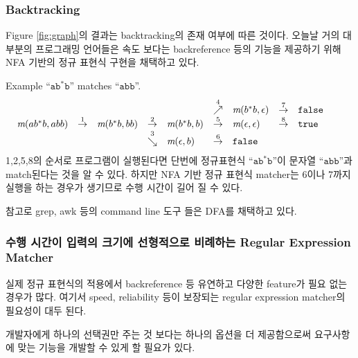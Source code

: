 \begin{frame}[shrink]
\frametitle{Backtracking}

Figure \ref{fig:graph}의 결과는 backtracking의 존재 여부에 따른 것이다.
오늘날 거의 대부분의 프로그래밍 언어들은 속도 보다는 backreference 등의 기능을 
제공하기 위해  NFA 기반의 정규 표현식 구현을 채택하고
있다.

\begin{block}{Example}
``$\texttt{ab}^{*}\texttt{b}$'' matches ``$\texttt{abb}$''.
\[
  \begin{array}{lllllllllll}
    &   &             &         &             &\stackrel{4}{\nearrow} &
    \rmatch{\e}{b^{*}b}&\stackrel{7}{\ra}& \F &  \\
    \rmatch{abb}{ab^{*}b} &\stackrel{1}{\ra}& \rmatch{bb}{b^{*}b} & \stackrel{2}{\ra}
    & \rmatch{b}{b^{*}b} &\stackrel{5}{\ra}     & \rmatch{\e}{\e}
    &\stackrel{8}{\ra}& \T &  \\
    &   &             & \stackrel{3}{\searrow} & \rmatch{b}{\e}
    &\stackrel{6}{\ra}     & \F  & &  & &   
  \end{array}
\]
1,2,5,8의 순서로 프로그램이 실행된다면 단번에 
정규표현식 ``$\texttt{ab}^{*}\texttt{b}$''이 문자열  ``$\texttt{abb}$''과
match된다는 것을 알 수 있다. 하지만 NFA 기반 정규 표현식 matcher는 6이나 
7까지 실행을 하는 경우가 생기므로 수행 시간이 길어 질 수 있다.
\end{block}

참고로 grep, awk 등의 command line 도구 들은 DFA를 채택하고 있다.

\end{frame}

\begin{frame}
\frametitle{수행 시간이 입력의 크기에 선형적으로 비례하는 Regular Expression Matcher}

실제 정규 표현식의 적용에서 backreference 등 유연하고 
다양한 feature가 필요 없는 경우가 많다.
여기서 speed, reliability 등이 보장되는 regular expression matcher의 
필요성이 대두 된다.

개발자에게 하나의 선택권만 주는 것 보다는 하나의 옵션을 더 제공함으로써
요구사항에 맞는 기능을 개발할 수 있게 할 필요가 있다.

\end{frame}
